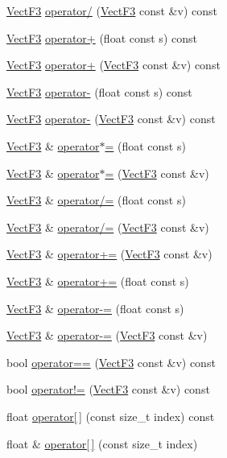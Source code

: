 \begin{DoxyCompactItemize}
\item 
\hyperlink{classVectF3}{Vect\-F3} \hyperlink{classVectF3_a3b001c4469b3f08ab93248301a249c12}{operator/} (\hyperlink{classVectF3}{Vect\-F3} const \&v) const 
\item 
\hyperlink{classVectF3}{Vect\-F3} \hyperlink{classVectF3_a0e5ed7dd31edec3f1490810abb6630a5}{operator+} (float const s) const 
\item 
\hyperlink{classVectF3}{Vect\-F3} \hyperlink{classVectF3_a756f3e07f2004684c1a93412d88e870f}{operator+} (\hyperlink{classVectF3}{Vect\-F3} const \&v) const 
\item 
\hyperlink{classVectF3}{Vect\-F3} \hyperlink{classVectF3_ad2b42fd072e26afd4c58693f77dd3a4e}{operator-\/} (float const s) const 
\item 
\hyperlink{classVectF3}{Vect\-F3} \hyperlink{classVectF3_aba35d4c9e63eb0ce0dee06bc8cddb0fb}{operator-\/} (\hyperlink{classVectF3}{Vect\-F3} const \&v) const 
\item 
\hyperlink{classVectF3}{Vect\-F3} \& \hyperlink{classVectF3_a8fa970fb8d7154293f927f523609aae3}{operator$\ast$=} (float const s)
\item 
\hyperlink{classVectF3}{Vect\-F3} \& \hyperlink{classVectF3_a6250da7c1a76aea064c5dfa1a9f4565e}{operator$\ast$=} (\hyperlink{classVectF3}{Vect\-F3} const \&v)
\item 
\hyperlink{classVectF3}{Vect\-F3} \& \hyperlink{classVectF3_a10476b715cf521223892b7ea2b49e251}{operator/=} (float const s)
\item 
\hyperlink{classVectF3}{Vect\-F3} \& \hyperlink{classVectF3_a8646feccd87df6c421842c6ecdde5fa6}{operator/=} (\hyperlink{classVectF3}{Vect\-F3} const \&v)
\item 
\hyperlink{classVectF3}{Vect\-F3} \& \hyperlink{classVectF3_a1d3ef5d26e2c42b93d6b39e6fa77b6a2}{operator+=} (\hyperlink{classVectF3}{Vect\-F3} const \&v)
\item 
\hyperlink{classVectF3}{Vect\-F3} \& \hyperlink{classVectF3_aaebe42eb83dfc17cfa1b68d74ca12086}{operator+=} (float const s)
\item 
\hyperlink{classVectF3}{Vect\-F3} \& \hyperlink{classVectF3_a777668af4c546e9889a0377d5f4222c9}{operator-\/=} (float const s)
\item 
\hyperlink{classVectF3}{Vect\-F3} \& \hyperlink{classVectF3_a738cd1ed5f917944c77f38228c085473}{operator-\/=} (\hyperlink{classVectF3}{Vect\-F3} const \&v)
\item 
bool \hyperlink{classVectF3_aad9ed0e5168ea5890d65445fc599028e}{operator==} (\hyperlink{classVectF3}{Vect\-F3} const \&v) const 
\item 
bool \hyperlink{classVectF3_a66c0ca7498880a6ebfc1c44d92bbb35e}{operator!=} (\hyperlink{classVectF3}{Vect\-F3} const \&v) const 
\item 
float \hyperlink{classVectF3_ab9c4c757a1cc8871e30337a8c2cf04cc}{operator\mbox{[}$\,$\mbox{]}} (const size\-\_\-t index) const 
\item 
float \& \hyperlink{classVectF3_a7bd79d6f811f748b4d0d7d41766f075d}{operator\mbox{[}$\,$\mbox{]}} (const size\-\_\-t index)
\end{DoxyCompactItemize}
